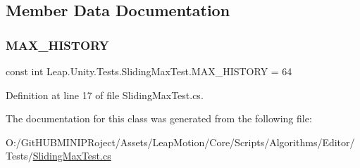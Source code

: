 \subsection{Member Data Documentation}
\mbox{\label{class_leap_1_1_unity_1_1_tests_1_1_sliding_max_test_a177bf4349b2bd7c7b56b859203dd6411}} 
\subsubsection{\texorpdfstring{MAX\_HISTORY}{MAX\_HISTORY}}
{\footnotesize\ttfamily const int Leap.\+Unity.\+Tests.\+Sliding\+Max\+Test.\+M\+A\+X\+\_\+\+H\+I\+S\+T\+O\+RY = 64}



Definition at line 17 of file Sliding\+Max\+Test.\+cs.



The documentation for this class was generated from the following file\+:\begin{DoxyCompactItemize}
\item 
O\+:/\+Git\+H\+U\+B\+M\+I\+N\+I\+P\+Roject/\+Assets/\+Leap\+Motion/\+Core/\+Scripts/\+Algorithms/\+Editor/\+Tests/\mbox{\hyperlink{_sliding_max_test_8cs}{Sliding\+Max\+Test.\+cs}}\end{DoxyCompactItemize}
